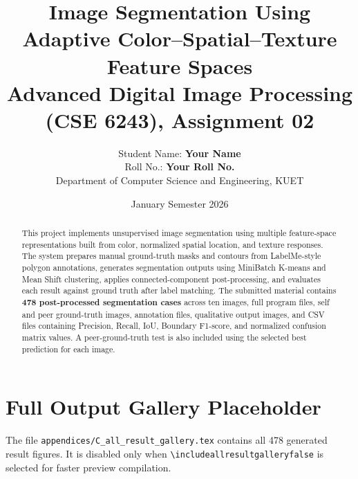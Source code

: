 \documentclass[11pt,a4paper]{article}
\title{\textbf{Image Segmentation Using Adaptive Color--Spatial--Texture Feature Spaces}\\[0.3em]
\large Advanced Digital Image Processing (CSE 6243), Assignment 02}
\author{Student Name: \textbf{Your Name} \\ Roll No.: \textbf{Your Roll No.} \\ Department of Computer Science and Engineering, KUET}
\date{January Semester 2026}
\newif\ifincludeallresultgallery
\begin{document}
\maketitle
\begin{abstract}
This project implements unsupervised image segmentation using multiple feature-space representations built from color, normalized spatial location, and texture responses. The system prepares manual ground-truth masks and contours from LabelMe-style polygon annotations, generates segmentation outputs using MiniBatch K-means and Mean Shift clustering, applies connected-component post-processing, and evaluates each result against ground truth after label matching. The submitted material contains \textbf{478 post-processed segmentation cases} across ten images, full program files, self and peer ground-truth images, annotation files, qualitative output images, and CSV files containing Precision, Recall, IoU, Boundary F1-score, and normalized confusion matrix values. A peer-ground-truth test is also included using the selected best prediction for each image.
\end{abstract}

\tableofcontents
\listoffigures
\listoftables
\clearpage












\appendix


\ifincludeallresultgallery
  
\else
  \section{Full Output Gallery Placeholder}
  The file \texttt{appendices/C\_all\_result\_gallery.tex} contains all 478 generated result figures. It is disabled only when \texttt{\textbackslash includeallresultgalleryfalse} is selected for faster preview compilation.
\fi
\end{document}
